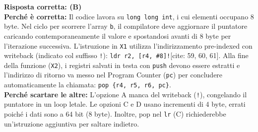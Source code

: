 \documentclass[12pt, a4paper]{article}
\begin{document}
\begin{enumerate}
\newpage
    
    \textbf{Risposta corretta: (B)} \\
    \textbf{Perché è corretta:} Il codice lavora su \texttt{long long int}, i cui elementi occupano 8 byte. Nel ciclo per scorrere l'array \texttt{b}, il compilatore deve aggiornare il puntatore caricando contemporaneamente il valore e spostandosi avanti di 8 byte per l'iterazione successiva. L'istruzione in \texttt{X1} utilizza l'indirizzamento pre-indexed con writeback (indicato col suffisso \texttt{!}): \texttt{ldr r2, [r4, \#8]!}[cite: 59, 60, 61]. Alla fine della funzione (\texttt{X2}), i registri salvati in testa con \texttt{push} devono essere estratti e l'indirizzo di ritorno va messo nel Program Counter (\texttt{pc}) per concludere automaticamente la chiamata: \texttt{pop \{r4, r5, r6, pc\}}. \\
    \textbf{Perché scartare le altre:} L'opzione A manca del writeback (\texttt{!}), congelando il puntatore in un loop letale. Le opzioni C e D usano incrementi di 4 byte, errati poiché i dati sono a 64 bit (8 byte). Inoltre, pop nel \texttt{lr} (C) richiederebbe un'istruzione aggiuntiva per saltare indietro.


\end{enumerate}
\end{document}
